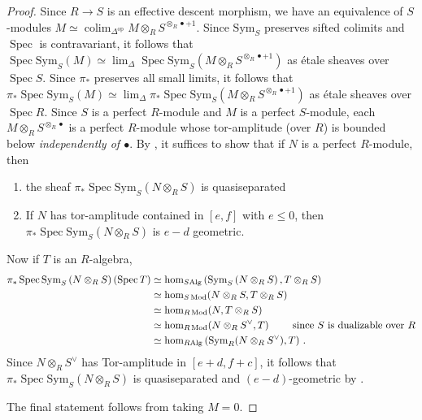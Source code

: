 \documentclass{article}
\DeclareMathOperator{\Spec}{Spec}
\DeclareMathOperator{\Mod}{Mod} %
\newcommand{\op}{\mathrm{op}} %
\DeclareMathOperator*{\colim}{\ensuremath{\operatorname{colim}}}
\theoremstyle{definition}
\newcommand{\Lucy}[1]{\todo[color=cyan!30]{\linespread{1}\footnotesize L: #1}}
\begin{document}
\begin{proof}
    Since $ R \to S $ is an effective descent morphism, we have an equivalence of $ S $-modules $ M \simeq \colim_{\Delta^\op} M \otimes_R S^{\otimes_R \bullet + 1} $. 
    Since $ \mathrm{Sym}_S $ preserves sifted colimits and $ \Spec $ is contravariant, it follows that $ \Spec \mathrm{Sym}_S (M) \simeq \lim_{\Delta} \Spec \mathrm{Sym}_S \left(M \otimes_R S^{\otimes_R \bullet + 1} \right) $ as \'etale sheaves over $ \Spec S $. 
    Since $ \pi_* $ preserves all small limits, it follows that $ \pi_* \Spec \mathrm{Sym}_S (M) \simeq \lim_{\Delta} \pi_* \Spec \mathrm{Sym}_S \left(M \otimes_R S^{\otimes_R \bullet + 1} \right) $ as \'etale sheaves over $ \Spec R $. 
    Since $ S $ is a perfect $ R $-module and $ M $ is a perfect $ S $-module, each $ M \otimes_R S^{\otimes_R \bullet} $ is a perfect $ R $-module whose tor-amplitude (over $ R $) is bounded below \emph{independently of $ \bullet$}. 
    By \cite[Lemma 4.36]{MR3190610}, it suffices to show that if $ N $ is a perfect $ R $-module, then
    \begin{enumerate}[label=(\arabic*)]
        \item the sheaf $ \pi_* \Spec \mathrm{Sym}_S \left(N \otimes_R S \right) $ is quasiseparated 
        \item If $ N $ has tor-amplitude contained in $ [e, f] $ with $ e \leq 0 $, then $ \pi_* \Spec \mathrm{Sym}_S \left(N \otimes_R S \right) $ is $ e - d $ geometric. 
    \end{enumerate}
    Now if $ T $ is an $ R $-algebra, 
    \begin{equation*}
    \begin{split}       
         \pi_* \Spec \mathrm{Sym}_S \left(N \otimes_R S \right)(\Spec T) & \simeq \hom_{S\mathrm{Alg}}\left(\mathrm{Sym}_S \left(N \otimes_R S \right), T \otimes_R S \right) \\
         &\simeq \hom_{S\Mod}(N \otimes_R S, T \otimes_R S) \\
         &\simeq \hom_{R\Mod}(N, T \otimes_R S) \\
         &\simeq \hom_{R \Mod }(N \otimes_R S^\vee, T)\qquad \text{ since $ S $ is dualizable over $ R $} \\
         &\simeq \hom_{R\mathrm{Alg}}\left(\mathrm{Sym}_R (N \otimes_R S^\vee), T\right)\,.
    \end{split}
    \end{equation*}
    Since $ N \otimes_R S^\vee $ has Tor-amplitude\Lucy{\cite[Proposition 2.13(4)]{MR3190610} or find ref in [TT90] later} in $ [e+d, f+c] $, it follows that $ \pi_* \Spec \mathrm{Sym}_S \left(N \otimes_R S \right) $ is quasiseparated and $ (e-d) $-geometric by \cite[Theorem 5.2]{MR3190610}. 

    The final statement follows from taking $ M = 0 $. 
\end{proof}
\end{document}
